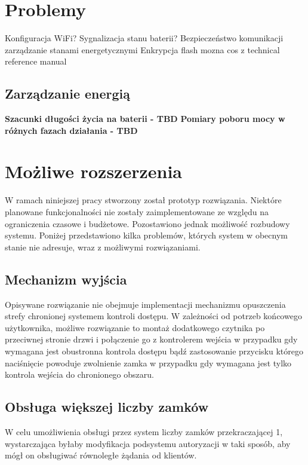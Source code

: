     \section{Problemy}

        Konfiguracja WiFi?
        Sygnalizacja stanu baterii?
        Bezpieczeństwo komunikacji
        zarządzanie stanami energetycznymi
        Enkrypcja flash
        mozna cos z technical reference manual

        \subsection{Zarządzanie energią}

            \textbf{Szacunki długości życia na baterii - TBD}
            \textbf{Pomiary poboru mocy w różnych fazach działania - TBD}

    \section{Możliwe rozszerzenia}

        W ramach niniejszej pracy stworzony został prototyp rozwiązania. Niektóre planowane funkcjonalności nie zostały zaimplementowane ze względu na ograniczenia czasowe i budżetowe. Pozostawiono jednak możliwość rozbudowy systemu. Poniżej przedstawiono kilka problemów, których system w obecnym stanie nie adresuje, wraz z możliwymi rozwiązaniami.

        \subsection{Mechanizm wyjścia}

            Opisywane rozwiązanie nie obejmuje implementacji mechanizmu opuszczenia strefy chronionej systemem kontroli dostępu. W zależności od potrzeb końcowego użytkownika, możliwe rozwiązanie to montaż dodatkowego czytnika po przeciwnej stronie drzwi i połączenie go z kontrolerem wejścia w przypadku gdy wymagana jest obustronna kontrola dostępu bądź zastosowanie przycisku którego naciśnięcie powoduje zwolnienie zamka w przypadku gdy wymagana jest tylko kontrola wejścia do chronionego obszaru.

        \subsection{Obsługa większej liczby zamków}

            W celu umożliwienia obsługi przez system liczby zamków przekraczającej 1, wystarczająca byłaby modyfikacja podsystemu autoryzacji w taki sposób, aby mógł on obsługiwać równoległe żądania od klientów.

